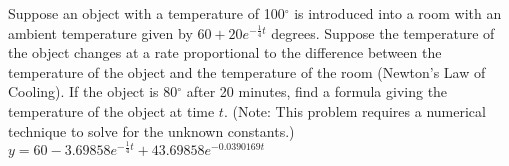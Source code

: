 {
Suppose an object with a temperature of 100$^\circ$ is introduced into a room with an ambient temperature given by $60 + 20e^{-\frac{1}{4}t}$ degrees.  Suppose the temperature of the object changes at a rate proportional to the difference between the temperature of the object and the temperature of the room (Newton's Law of Cooling).  If the object is 80$^\circ$ after 20 minutes, find a formula giving the temperature of the object at time $t$.  (Note:  This problem requires a numerical technique to solve for the unknown constants.) 
}
{
$\displaystyle y = 60 - 3.69858e^{-\frac{1}{4}t} + 43.69858e^{-0.0390169 t}$
}
